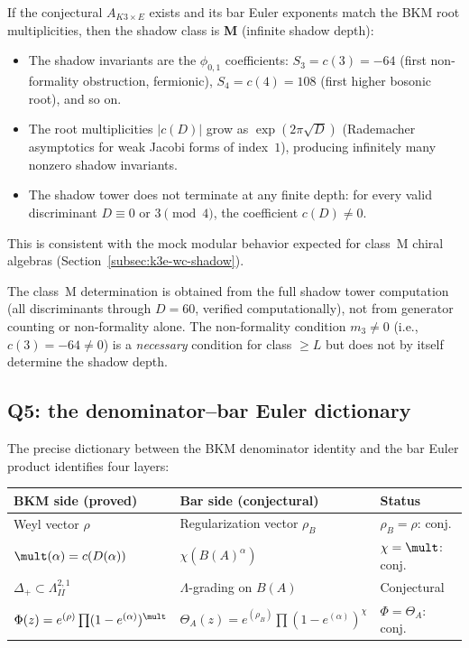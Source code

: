 If the conjectural $A_{K3 \times E}$ exists and its bar Euler exponents match the BKM root multiplicities, then the shadow class is \textbf{M} (infinite shadow depth):
\begin{itemize}
 \item The shadow invariants are the $\phi_{0,1}$ coefficients: $S_3 = c(3) = -64$ (first non-formality obstruction, fermionic), $S_4 = c(4) = 108$ (first higher bosonic root), and so on.
 \item The root multiplicities $|c(D)|$ grow as $\exp(2\pi\sqrt{D})$ (Rademacher asymptotics for weak Jacobi forms of index~$1$), producing infinitely many nonzero shadow invariants.
 \item The shadow tower does not terminate at any finite depth: for every valid discriminant $D \equiv 0$ or $3 \pmod{4}$, the coefficient $c(D) \neq 0$.
\end{itemize}
This is consistent with the mock modular behavior expected for class~M chiral algebras (Section~\ref{subsec:k3e-wc-shadow}).

\begin{warning}
\label{warn:bkm-shadow-class}
The class~M determination is obtained from the full shadow tower computation (all discriminants through $D = 60$, verified computationally), not from generator counting or non-formality alone. The non-formality condition $m_3 \neq 0$ (i.e., $c(3) = -64 \neq 0$) is a \emph{necessary} condition for class $\geq L$ but does not by itself determine the shadow depth.
\end{warning}

\subsection{Q5: the denominator--bar Euler dictionary}
\label{subsec:k3e-bkm-q5}

The precise dictionary between the BKM denominator identity and the bar Euler product identifies four layers:

\begin{center}
\renewcommand{\arraystretch}{1.3}
\begin{tabular}{@{}p{4.8cm}p{4.8cm}l@{}}
\textbf{BKM side (proved)} & \textbf{Bar side (conjectural)} & \textbf{Status} \\ \hline
Weyl vector $\rho$ & Regularization vector $\rho_B$ & $\rho_B = \rho$: conj. \\[3pt]
$\mult(\alpha) = c(D(\alpha))$ & $\chi(B(A)^\alpha)$ & $\chi = \mult$: conj. \\[3pt]
$\Delta_+ \subset \Lambda^{2,1}_{II}$ & $\Lambda$-grading on $B(A)$ & Conjectural \\[3pt]
$\Phi(z) = e^{(\rho)} \prod (1 - e^{(\alpha)})^{\mult}$ & $\Theta_A(z) = e^{(\rho_B)} \prod (1 - e^{(\alpha)})^{\chi}$ & $\Phi = \Theta_A$: conj.
\end{tabular}
\end{center}


